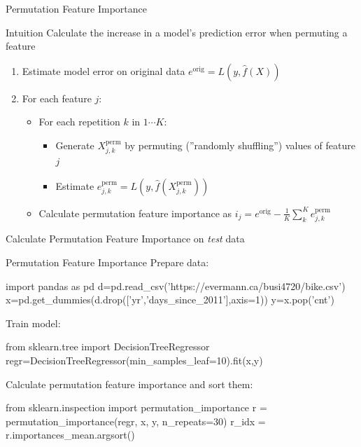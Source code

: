 \documentclass[ignorenonframetext,xcolor=x11names]{beamer}
\begin{document}
\begin{frame}{Permutation Feature Importance}

\begin{block}{Intuition}
Calculate the increase in a model's prediction error when permuting a feature
\end{block}

\begin{enumerate}
\item Estimate model error on original data $e^{\text{orig}} = L(y, \hat{f}(X))$
\item For each feature $j$:
  \begin{itemize}
     \item For each repetition $k$ in $1 \cdots K$:
     \begin{itemize}
        \item Generate $X^{\text{perm}}_{j, k}$ by permuting (''randomly shuffling'') values of feature $j$
        \item Estimate $e^{\text{perm}}_{j, k} = L(y, \hat{f}(X^{\text{perm}}_{j, k}))$
     \end{itemize}
     \item Calculate permutation feature importance as $i_j = e^{\text{orig}} - \frac{1}{K}\sum_k^K e^{\text{perm}}_{j, k}$
  \end{itemize}
\end{enumerate}
\begin{block}{}
Calculate Permutation Feature Importance on \emph{test} data
\end{block}
\end{frame}

\begin{frame}[fragile]{Permutation Feature Importance}
Prepare data:
\begin{pythoncode}
import pandas as pd
d=pd.read_csv('https://evermann.ca/busi4720/bike.csv')
x=pd.get_dummies(d.drop(['yr','days_since_2011'],axis=1))
y=x.pop('cnt')
\end{pythoncode}
Train model:
\begin{pythoncode}
from sklearn.tree import DecisionTreeRegressor
regr=DecisionTreeRegressor(min_samples_leaf=10).fit(x,y)
\end{pythoncode}
Calculate permutation feature importance and sort them:
\begin{pythoncode}
from sklearn.inspection import permutation_importance
r = permutation_importance(regr, x, y, n_repeats=30)
r_idx = r.importances_mean.argsort()
\end{pythoncode}
\end{frame}
\end{document}
